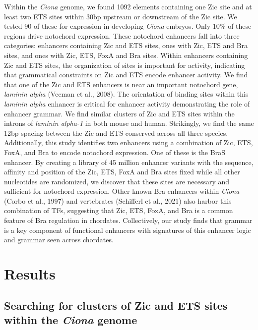 Within the \textit{Ciona} genome, we found 1092 elements containing one Zic site and at least two ETS sites within 30bp upstream or downstream of the Zic site. We tested 90 of these for expression in developing \textit{Ciona} embryos. Only 10\% of these regions drive notochord expression. These notochord enhancers fall into three categories: enhancers containing Zic and ETS sites, ones with Zic, ETS and Bra sites, and ones with Zic, ETS, FoxA and Bra sites. Within enhancers containing Zic and ETS sites, the organization of sites is important for activity, indicating that grammatical constraints on Zic and ETS encode enhancer activity. We find that one of the Zic and ETS enhancers is near an important notochord gene, \textit{laminin alpha} (Veeman et al., 2008). The orientation of binding sites within this \textit{laminin alpha} enhancer is critical for enhancer activity demonstrating the role of enhancer grammar.  We find similar clusters of Zic and ETS sites within the introns of \textit{laminin alpha-1} in both mouse and human. Strikingly, we find the same 12bp spacing between the Zic and ETS conserved across all three species. Additionally, this study identifies two enhancers using a combination of Zic, ETS, FoxA, and Bra to encode notochord expression. One of these is the BraS enhancer. By creating a library of 45 million enhancer variants with the sequence, affinity and position of the Zic, ETS, FoxA and Bra sites fixed while all other nucleotides are randomized, we discover that these sites are necessary and sufficient for notochord expression. Other known Bra enhancers within \textit{Ciona} (Corbo et al., 1997) and vertebrates (Schifferl et al., 2021) also harbor this combination of TFs, suggesting that Zic, ETS, FoxA, and Bra is a common feature of Bra regulation in chordates. Collectively, our study finds that grammar is a key component of functional enhancers with signatures of this enhancer logic and grammar seen across chordates. 

\section{Results}

\subsection{Searching for clusters of Zic and ETS sites within the \textit{Ciona} genome}

